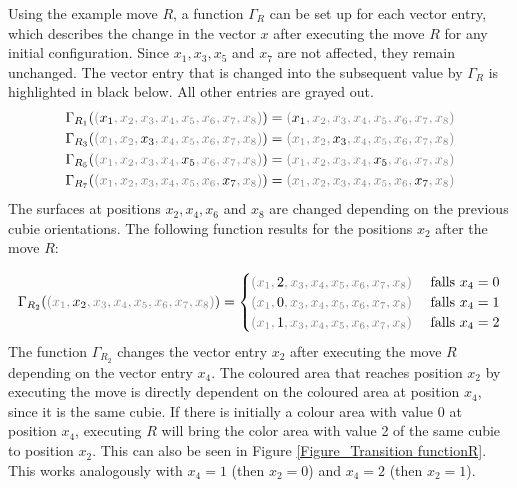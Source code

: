 \documentclass[12pt,a4paper]{article}
\theoremstyle{custom}
\begin{document}
Using the example move $R$, a function $\Gamma_R$ can be set up for each vector entry, which describes the change in the vector $x$ after executing the move $R$ for any initial configuration. Since $x_1, x_3, x_5$ and $x_7$ are not affected, they remain unchanged. The vector entry that is changed into the subsequent value by $\Gamma_R$ is highlighted in black below. All other entries are grayed out.
\begin{align*}
& \Gamma_{R_1}(\textcolor{gray}{(\textcolor{black}{x_1}, x_2, x_3, x_4, x_5, x_6, x_7, x_8  )})=\textcolor{gray}{(\textcolor{black}{x_1}, x_2, x_3, x_4, x_5, x_6, x_7, x_8  )} \\
& \Gamma_{R_3}(\textcolor{gray}{(x_1, x_2, \textcolor{black}{x_3}, x_4, x_5, x_6, x_7, x_8  )})=\textcolor{gray}{(x_1, x_2, \textcolor{black}{x_3}, x_4, x_5, x_6, x_7, x_8  )} \\
& \Gamma_{R_5}(\textcolor{gray}{(x_1, x_2, x_3, x_4, \textcolor{black}{x_5}, x_6, x_7, x_8  )})=\textcolor{gray}{(x_1, x_2, x_3, x_4, \textcolor{black}{x_5}, x_6, x_7, x_8  )}\\
& \Gamma_{R_7}(\textcolor{gray}{(x_1, x_2, x_3, x_4, x_5, x_6,\textcolor{black}{x_7}, x_8  )})=\textcolor{gray}{(x_1, x_2, x_3, x_4, x_5, x_6, \textcolor{black}{x_7}, x_8  )} 
\end{align*}
The surfaces at positions $x_2, x_4, x_6$ and $x_8$ are changed depending on the previous cubie orientations. The following function results for the positions $x_2$ after the move $R$:


\begin{align*}
\Gamma_{R_2}(\textcolor{gray}{(x_1, \textcolor{black}{x_2}, x_3, x_4, x_5, x_6, x_7, x_8  )})= \begin{cases}
\textcolor{gray}{(x_1, \textcolor{black}{2}, x_3, x_4, x_5, x_6, x_7, x_8  )} & \ \text{falls } x_4 = 0 \\ 
\textcolor{gray}{(x_1, \textcolor{black}{0}, x_3, x_4, x_5, x_6, x_7, x_8  )} & \ \text{falls } x_4 = 1 \\
\textcolor{gray}{(x_1, \textcolor{black}{1}, x_3, x_4, x_5, x_6, x_7, x_8  )} & \ \text{falls } x_4 = 2 
\end{cases}
\end{align*}
The function $\Gamma_{R_2}$ changes the vector entry $x_2$ after executing the move $R$ depending on the vector entry $x_4$. The coloured area that reaches position $x_2$ by executing the move is directly dependent on the coloured area at position $x_4$, since it is the same cubie. If there is initially a colour area with value 0 at position $x_4$, executing $R$ will bring the color area with value 2 of the same cubie to position $x_2$. This can also be seen in Figure \ref{Figure_Transition functionR}. This works analogously with $x_4 = 1$ (then $x_2 = 0$) and $x_4=2$ (then $x_2 = 1$).
\end{document}
